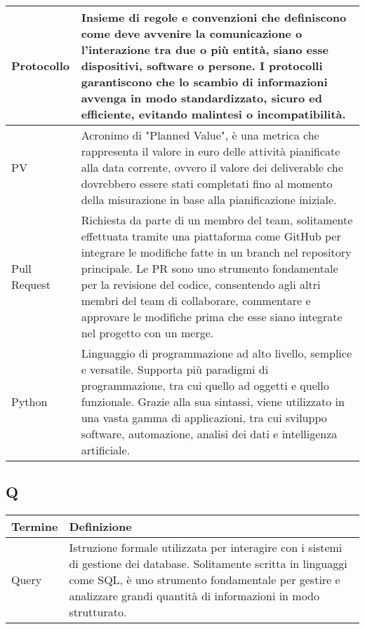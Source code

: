 \documentclass[10pt]{article}
\begin{document}
\begin{longtable}{|>{\centering\arraybackslash}m{2.5cm}|>{\arraybackslash}m{12.5cm}|}
\hline
Protocollo & Insieme di regole e convenzioni che definiscono come deve avvenire la comunicazione o l'interazione tra due o più entità, siano esse dispositivi, software o persone. I protocolli garantiscono che lo scambio di informazioni avvenga in modo standardizzato, sicuro ed efficiente, evitando malintesi o incompatibilità.\\
\hline
PV & Acronimo di "Planned Value", è una metrica che rappresenta il valore in euro delle attività pianificate alla data corrente, ovvero il valore dei deliverable che dovrebbero essere stati completati fino al momento della misurazione in base alla pianificazione iniziale.\\
\hline
Pull Request & Richiesta da parte di un membro del team, solitamente effettuata tramite una piattaforma come GitHub per integrare le modifiche fatte in un branch nel repository principale. Le PR sono uno strumento fondamentale per la revisione del codice, consentendo agli altri membri del team di collaborare, commentare e approvare le modifiche prima che esse siano integrate nel progetto con un merge.\\
\hline
Python & Linguaggio di programmazione ad alto livello, semplice e versatile. Supporta più paradigmi di programmazione, tra cui quello ad oggetti e quello funzionale. Grazie alla sua sintassi, viene utilizzato in una vasta gamma di applicazioni, tra cui sviluppo software, automazione, analisi dei dati e intelligenza artificiale.\\
\hline
\end{longtable}

\subsection{Q} %
\begin{longtable}{|>{\centering\arraybackslash}m{2.5cm}|>{\arraybackslash}m{12.5cm}|}
\hline
\rowcolor[gray]{0.8}
\textbf{Termine} & \textbf{Definizione}\\
\endhead
\hline
Query & Istruzione formale utilizzata per interagire con i sistemi di gestione dei database. Solitamente scritta in linguaggi come SQL, è uno strumento fondamentale per gestire e analizzare grandi quantità di informazioni in modo strutturato.\\
\hline
\end{longtable}
\end{document}
